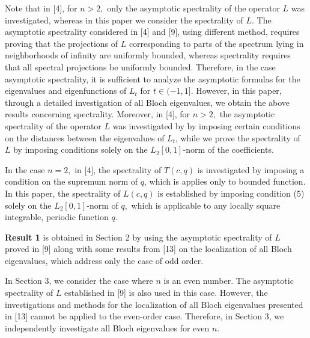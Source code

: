 \documentclass{article}%
\begin{document}
Note that in [4], for $n>2,$ only the asymptotic spectrality of the operator
$L$ was investigated, whereas in this paper we consider the spectrality of
$L.$ The asymptotic spectrality considered in [4] and [9], using different
method, requires proving that the projections of $L$ corresponding to parts of
the spectrum lying in neighborhoods of infinity are uniformly bounded, whereas
spectrality requires that all spectral projections be uniformly bounded.
Therefore, in the case asymptotic spectrality, it is sufficient to analyze the
asymptotic formulas for the eigenvalues and eigenfunctions of $L_{t}$ for
$t\in(-1,1]$. However, in this paper, through a detailed investigation of all
Bloch eigenvalues, we obtain the above results concerning spectrality.
Moreover, in [4], for $n>2,$ the asymptotic spectrality of the operator $L$
was investigated by by imposing certain conditions on the distances between
the eigenvalues of $L_{t}$, while we prove the spectrality of $L$ by imposing
conditions solely on the $L_{2}\left[  0,1\right]  $-norm of the coefficients.

In the case $n=2,$ in [4], the spectrality of $T(c,q)$ is investigated by
imposing a condition on the supremum norm of $q$, which is applies only to
bounded function. In this paper, the spectrality of $L(c,q)$ is established by
imposing condition (5) solely on the $L_{2}\left[  0,1\right]  $-norm of $q,$
which is applicable to any locally square integrable, periodic function $q$.

\textbf{Result 1} is obtained in Section 2 by using the asymptotic spectrality
of $L$ proved in [9] along with some results from [13] on the localization of
all Bloch eigenvalues, which address only the case of odd order.

In Section 3, we consider the case where $n$ is an even number. The asymptotic
spectrality of $L$ established in [9] is also used in this case. However, the
investigations and methods for the localization of all Bloch eigenvalues
presented in [13] cannot be applied to the even-order case. Therefore, in
Section 3, we independently investigate all Bloch eigenvalues for even $n.$
\end{document}
